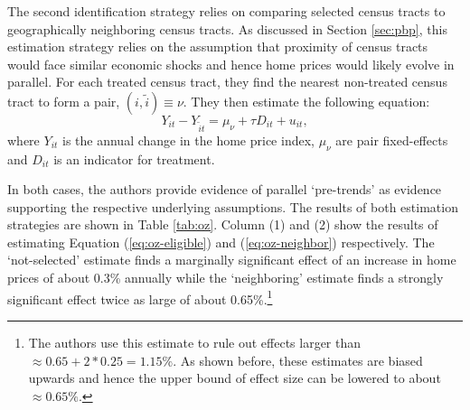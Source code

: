 \documentclass[11pt]{article}
\begin{document}
The second identification strategy relies on comparing selected census tracts to geographically neighboring census tracts. As discussed in Section \ref{sec:pbp}, this estimation strategy relies on the assumption that proximity of census tracts would face similar economic shocks and hence home prices would likely evolve in parallel. For each treated census tract, they find the nearest non-treated census tract to form a pair, $(i, \tilde{i}) \equiv \nu$. They then estimate the following equation:
\begin{equation}\label{eq:oz-neighbor}
    Y_{it} - Y_{\tilde{i}t}  = \mu_\nu + \tau D_{it} + u_{it},
\end{equation}
where $Y_{it}$ is the annual change in the home price index, $\mu_\nu$ are pair fixed-effects and $D_{it}$ is an indicator for treatment. 

In both cases, the authors provide evidence of parallel `pre-trends' as evidence supporting the respective underlying assumptions. The results of both estimation strategies are shown in Table \ref{tab:oz}. Column (1) and (2) show the results of estimating Equation (\ref{eq:oz-eligible}) and (\ref{eq:oz-neighbor}) respectively. The `not-selected' estimate finds a marginally significant effect of an increase in home prices of about 0.3\% annually while the `neighboring' estimate finds a strongly significant effect twice as large of about 0.65\%.\footnote{The authors use this estimate to rule out effects larger than $\approx 0.65 + 2 * 0.25 = 1.15\%$. As shown before, these estimates are biased upwards and hence the upper bound of effect size can be lowered to about $\approx 0.65\%$.} 
\end{document}
